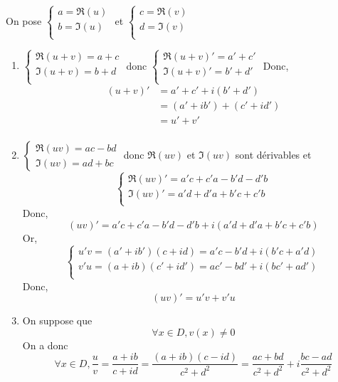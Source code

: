 \begin{prv}
	On pose $\begin{cases}
		a = \Re(u)\\
		b = \Im(u)\\
	\end{cases}$ et $\begin{cases}
		c = \Re(v)\\
		d = \Im(v)\\
	\end{cases}$\\
	\begin{enumerate}
		\item $\begin{cases}
				\Re(u+v) = a + c\\
				\Im(u+v) = b + d\\
			\end{cases}$ donc $\begin{cases}
				\Re(u+v)' = a'+c'\\
				\Im(u+v)' = b'+d'\\
			\end{cases}$ Donc,
			\begin{align*}
				(u+v)' &= a'+c'+i(b'+d')\\
				&= (a'+ib') + (c'+id') \\
				&= u'+v' \\
			\end{align*}
		\item $\begin{cases}
				\Re(uv) = ac-bd\\
				\Im(uv) = ad+bc
			\end{cases}$ donc $\Re(uv)$ et $\Im(uv)$ sont dérivables et \[
				\begin{cases}
					\Re(uv)' = a'c+c'a-b'd-d'b\\
					\Im(uv)' = a'd+d'a+b'c+c'b\\
				\end{cases}
			\] Donc, \[
				(uv)' = a'c+c'a-b'd-d'b + i(a'd+d'a+b'c+c'b)
			\] 
			Or, \[
				\begin{cases}
					u'v = (a'+ib')(c+id) = a'c - b'd + i(b'c + a'd)\\
					v'u = (a+ib)(c'+id') = ac' - bd' + i(bc' + ad')\\
				\end{cases}
			\] Donc, \[
			(uv)' = u'v + v'u
			\]
		\item On suppose que \[
				\forall x \in D, v(x) \neq 0
			\] 
			On a donc \[
				\forall x \in D, \frac{u}{v} = \frac{a+ib}{c+id} = \frac{(a+ib)(c-id)}{c^2+d^2} = \frac{ac + bd}{c^2+d^2} + i \frac{bc - ad}{c^2+d^2}
\]
\end{enumerate}
\end{prv}
